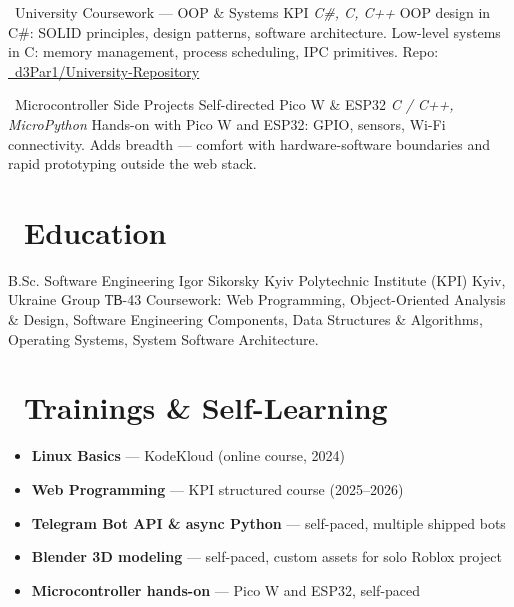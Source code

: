 \documentclass[10pt,a4paper,sans]{moderncv}
\begin{document}
        {\faGraduationCap\ University Coursework — OOP \& Systems}
        {KPI}
        {}
        {\textit{C\#, C, C++}}
        {\small OOP design in C\#: SOLID principles, design patterns, software architecture. Low-level systems in C: memory management, process scheduling, IPC primitives. Repo: \href{https://github.com/d3Par1/University-Repository}{\faGithub\ d3Par1/University-Repository}}

        {\faMicrochip\ Microcontroller Side Projects}
        {Self-directed}
        {Pico W \& ESP32}
        {\textit{C / C++, MicroPython}}
        {\small Hands-on with Pico W and ESP32: GPIO, sensors, Wi-Fi connectivity. Adds breadth — comfort with hardware-software boundaries and rapid prototyping outside the web stack.}

\section{\faUniversity\ Education}
        {B.Sc. Software Engineering}
        {Igor Sikorsky Kyiv Polytechnic Institute (KPI)}
        {Kyiv, Ukraine}
        {Group \textukrainian{ТВ}-43}
        {\small Coursework: Web Programming, Object-Oriented Analysis \& Design, Software Engineering Components, Data Structures \& Algorithms, Operating Systems, System Software Architecture.}

\section{\faCertificate\ Trainings \& Self-Learning}
\begin{itemize}
    \item[\faBookmark] \small \textbf{Linux Basics} — KodeKloud (online course, 2024)
    \item[\faBookmark] \small \textbf{Web Programming} — KPI structured course (2025--2026)
    \item[\faBookmark] \small \textbf{Telegram Bot API \& async Python} — self-paced, multiple shipped bots
    \item[\faBookmark] \small \textbf{Blender 3D modeling} — self-paced, custom assets for solo Roblox project
    \item[\faBookmark] \small \textbf{Microcontroller hands-on} — Pico W and ESP32, self-paced
\end{itemize}
\end{document}
